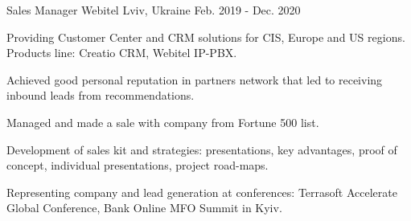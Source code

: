 \begin{cventries}
{\begin{cvitems}
      \end{cvitems}
    }
\newline
\newline
  \cventry
    {Sales Manager} %
    {Webitel} %
    {Lviv, Ukraine} %
    {Feb. 2019 - Dec. 2020} %
    {
      \begin{cvitems} %
        \item {Providing Customer Center and CRM solutions for CIS, Europe and US regions. Products line: Creatio CRM, Webitel IP-PBX.}
        \item {Achieved good personal reputation in partners network that led to receiving inbound leads from recommendations.}
        \item {Managed and made a sale with company from Fortune 500 list.}
        \item {Development of sales kit and strategies: presentations, key advantages, proof of concept, individual presentations, project road-maps.}
        \item {Representing company and lead generation at conferences: Terrasoft Accelerate Global Conference, Bank Online MFO Summit in Kyiv.}
      \end{cvitems}
    }
\end{cventries}